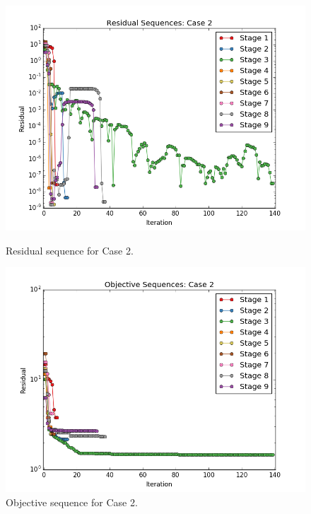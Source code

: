 \documentclass[]{aiaa-tc}%
\begin{document}
\begin{figure}[!ht]
\centering
\begin{minipage}{.50\textwidth}
 \centering
 \includegraphics[width=.8\textwidth]{../images/residual_case2}
 \caption{Residual sequence for Case 2.}
 \label{fig:residual_case2}
\end{minipage}%
\begin{minipage}{.50\textwidth}
 \centering
 \includegraphics[width=.8\textwidth]{../images/objective_case2}
 \caption{Objective sequence for Case 2.}
 \label{fig:objective_case2}
\end{minipage}
\end{figure}
\end{document}
